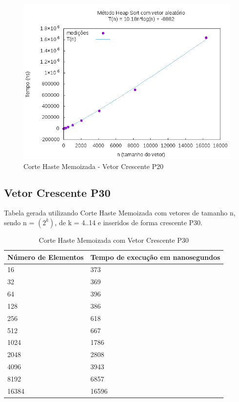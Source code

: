 \documentclass[12pt,a4paper,twoside]{report}
\begin{document}
\begin{figure}[H]
    \centering
    \includegraphics[width=0.7\linewidth]{graficos/HeapSort/vIntAleatorio/vIntAleatorio.png}
  \caption{Corte Haste Memoizada - Vetor Crescente P20}
\end{figure}



\subsection{Vetor Crescente P30}
Tabela gerada utilizando Corte Haste Memoizada com vetores de tamanho n, sendo n = $(2^k)$, de k = 4..14 e inseridos de forma crescente P30.
\begin{table}[H]
\centering
\caption{Corte Haste Memoizada com Vetor Crescente P30}
\label{my-label}
\begin{tabular}{|l|l|}
\hline
\multicolumn{1}{|c|}{\textbf{Número de Elementos}} & \multicolumn{1}{c|}{\textbf{Tempo de execução em nanosegundos}} \\ \hline
16 & 373 \\ \hline
32 & 369 \\ \hline
64 & 396 \\ \hline
128 & 386 \\ \hline
256 & 618 \\ \hline
512 & 667 \\ \hline
1024 & 1786 \\ \hline
2048 & 2808 \\ \hline
4096 & 3943 \\ \hline
8192 & 6857 \\ \hline
16384 & 16596 \\ \hline
\end{tabular}
\end{table}
\end{document}
